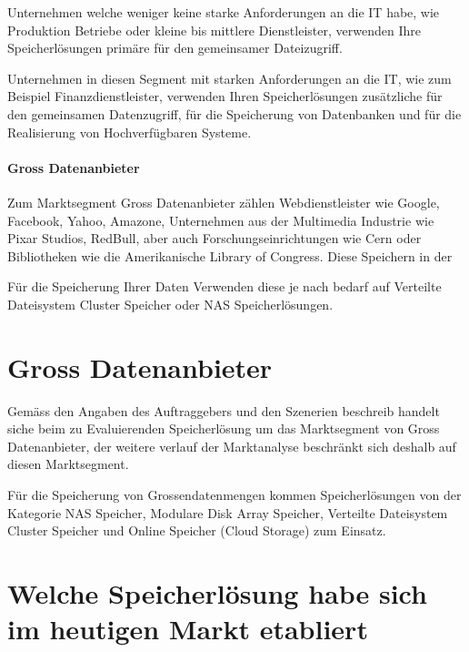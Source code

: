 Unternehmen welche weniger keine starke Anforderungen an die IT habe, wie Produktion Betriebe oder kleine bis mittlere Dienstleister, verwenden Ihre Speicherlösungen primäre für den gemeinsamer Dateizugriff. 


Unternehmen in diesen Segment mit starken Anforderungen an die IT, wie zum Beispiel Finanzdienstleister, verwenden Ihren Speicherlösungen zusätzliche für den gemeinsamen Datenzugriff, für die Speicherung von Datenbanken und für die Realisierung von Hochverfügbaren Systeme.


\paragraph{Gross Datenanbieter}
Zum Marktsegment Gross Datenanbieter zählen Webdienstleister wie Google, Facebook, Yahoo, Amazone, Unternehmen aus der Multimedia Industrie wie Pixar Studios, RedBull, aber auch Forschungseinrichtungen wie Cern oder Bibliotheken wie die Amerikanische Library of Congress.
Diese Speichern in der 

Für die Speicherung Ihrer Daten Verwenden diese je nach bedarf auf Verteilte Dateisystem Cluster Speicher oder NAS Speicherlösungen. 

\section{Gross Datenanbieter}
Gemäss den Angaben des Auftraggebers und den Szenerien beschreib handelt siche beim zu Evaluierenden Speicherlösung um das Marktsegment von Gross Datenanbieter, der weitere verlauf der Marktanalyse beschränkt sich deshalb auf diesen Marktsegment.

Für die Speicherung von Grossendatenmengen kommen Speicherlösungen von der Kategorie NAS Speicher, Modulare Disk Array Speicher, Verteilte Dateisystem Cluster Speicher und Online Speicher (Cloud Storage) zum Einsatz.

\section{Welche Speicherlösung habe sich im heutigen Markt etabliert }\label{MartkEtabliert}

